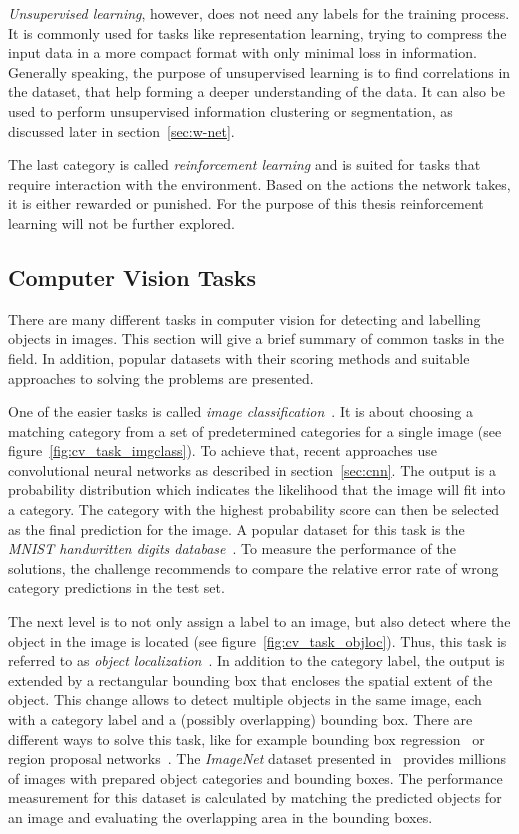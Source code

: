 \emph{Unsupervised learning}, however, does not need any labels for the training process. It is commonly used for tasks like representation learning, trying to compress the input data in a more compact format with only minimal loss in information. Generally speaking, the purpose of unsupervised learning is to find correlations in the dataset, that help forming a deeper understanding of the data. It can also be used to perform unsupervised information clustering or segmentation, as discussed later in section~\ref{sec:w-net}.

The last category is called \emph{reinforcement learning} and is suited for tasks that require interaction with the environment. Based on the actions the network takes, it is either rewarded or punished. For the purpose of this thesis reinforcement learning will not be further explored.

\subsection{Computer Vision Tasks}
There are many different tasks in computer vision for detecting and labelling objects in images. This section will give a brief summary of common tasks in the field. In addition, popular datasets with their scoring methods and suitable approaches to solving the problems are presented.

One of the easier tasks is called \emph{image classification}~\cite[p.~98]{DLbook16}. It is about choosing a matching category from a set of predetermined categories for a single image (see figure~\ref{fig:cv_task_imgclass}). To achieve that, recent approaches use convolutional neural networks as described in section~\ref{sec:cnn}. The output is a probability distribution which indicates the likelihood that the image will fit into a category. The category with the highest probability score can then be selected as the final prediction for the image. A popular dataset for this task is the \emph{MNIST handwritten digits database}~\cite{mnist10}. To measure the performance of the solutions, the challenge recommends to compare the relative error rate of wrong category predictions in the test set.

The next level is to not only assign a label to an image, but also detect where the object in the image is located (see figure~\ref{fig:cv_task_objloc}). Thus, this task is referred to as \emph{object localization}~\cite{rcnn14}. In addition to the category label, the output is extended by a rectangular bounding box that encloses the spatial extent of the object. This change allows to detect multiple objects in the same image, each with a category label and a (possibly overlapping) bounding box. There are different ways to solve this task, like for example bounding box regression~\cite{obj_detection13} or region proposal networks~\cite{ff-rcnn14}. The \emph{ImageNet} dataset presented in~\cite{imgnet09} provides millions of images with prepared object categories and bounding boxes. The performance measurement for this dataset is calculated by matching the predicted objects for an image and evaluating the overlapping area in the bounding boxes.

